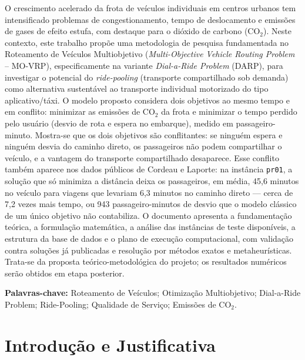 \documentclass[12pt,a4paper]{article}
\theoremstyle{plain}
\begin{document}
O crescimento acelerado da frota de veículos individuais em centros urbanos tem intensificado problemas de congestionamento, tempo de deslocamento e emissões de gases de efeito estufa, com destaque para o dióxido de carbono ($\text{CO}_2$). Neste contexto, este trabalho propõe uma metodologia de pesquisa fundamentada no Roteamento de Veículos Multiobjetivo (\textit{Multi-Objective Vehicle Routing Problem} -- MO-VRP), especificamente na variante \textit{Dial-a-Ride Problem} (DARP), para investigar o potencial do \textit{ride-pooling} (transporte compartilhado sob demanda) como alternativa sustentável ao transporte individual motorizado do tipo aplicativo/táxi. O modelo proposto considera dois objetivos ao mesmo tempo e em conflito: minimizar as emissões de $\text{CO}_2$ da frota e minimizar o tempo perdido pelo usuário (desvio de rota e espera no embarque), medido em passageiro-minuto. Mostra-se que os dois objetivos são conflitantes: se ninguém espera e ninguém desvia do caminho direto, os passageiros não podem compartilhar o veículo, e a vantagem do transporte compartilhado desaparece. Esse conflito também aparece nos dados públicos de Cordeau e Laporte: na instância \texttt{pr01}, a solução que só minimiza a distância deixa os passageiros, em média, 45,6 minutos no veículo para viagens que levariam 6,3 minutos no caminho direto --- cerca de 7,2 vezes mais tempo, ou 943 passageiro-minutos de desvio que o modelo clássico de um único objetivo não contabiliza. O documento apresenta a fundamentação teórica, a formulação matemática, a análise das instâncias de teste disponíveis, a estrutura da base de dados e o plano de execução computacional, com validação contra soluções já publicadas e resolução por métodos exatos e metaheurísticas. Trata-se da proposta teórico-metodológica do projeto; os resultados numéricos serão obtidos em etapa posterior.

\textbf{Palavras-chave:} Roteamento de Veículos; Otimização Multiobjetivo; Dial-a-Ride Problem; Ride-Pooling; Qualidade de Serviço; Emissões de $\text{CO}_2$.

\vspace{1cm}

\newpage
\tableofcontents
\newpage

\section{Introdução e Justificativa}
\end{document}
